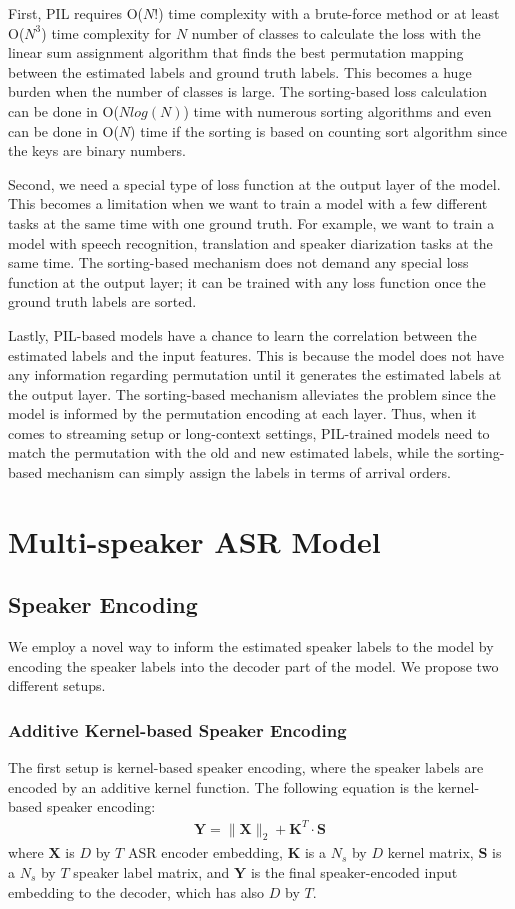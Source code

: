 \documentclass{article}
\begin{document}
First, PIL requires O($N!$) time complexity with a brute-force method
or at least O($N^3$) time complexity for $N$ number of classes
to calculate the loss with the linear sum assignment algorithm that finds
the best permutation mapping between the estimated labels and ground truth labels.
This becomes a huge burden when the number of classes is large.
The sorting-based loss calculation can be done in O($Nlog(N)$) time with numerous sorting algorithms and
even can be done in O($N$) time if the sorting is based on counting sort algorithm since the keys are binary numbers.

Second, we need a special type of loss function at the output layer of the model.
This becomes a limitation when we want to train a model with a few different tasks at the same time with one ground truth.
For example, we want to train a model with speech recognition, translation and speaker diarization tasks at the same time.
The sorting-based mechanism does not demand any special loss function at the output layer; it can be trained with any loss function once the
ground truth labels are sorted.

Lastly, PIL-based models have a chance to learn the correlation between the estimated labels and the input features.
This is because the model does not have any information regarding permutation until it generates the estimated labels at the output layer.
The sorting-based mechanism alleviates the problem since the model is informed by the permutation encoding at each layer.
Thus, when it comes to streaming setup or long-context settings, PIL-trained models need to match the permutation with the old and new estimated labels,
while the sorting-based mechanism can simply assign the labels in terms of arrival orders.

\section{Multi-speaker ASR Model}
\subsection{Speaker Encoding}
We employ a novel way to inform the estimated speaker labels to the model by encoding the speaker labels into the decoder part of the model.
We propose two different setups. 
\subsubsection{Additive Kernel-based Speaker Encoding}
The first setup is kernel-based speaker encoding, where the speaker labels are encoded by an additive kernel function.
The following equation is the kernel-based speaker encoding:
\begin{align}
    \mathbf{Y} = \| \mathbf{X} \|_2 + \mathbf{K}^T\cdot \mathbf{S} 
\end{align}
where $\mathbf{X}$ is $D$ by $T$ ASR encoder embedding, $\mathbf{K}$ is a $N_s$ by $D$ kernel matrix, 
$\mathbf{S}$ is a $N_s$ by $T$ speaker label matrix, and $\mathbf{Y}$ is the final speaker-encoded input embedding to the decoder, which has also $D$ by $T$.
\end{document}
